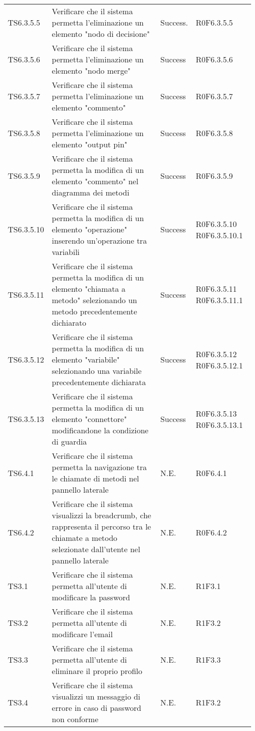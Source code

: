 \begin{longtable}{p{2.5cm}!{\VRule[1pt]}p{6cm}!{\VRule[1pt]}p{1.5cm}!{\VRule[1pt]}p{3cm}}
TS6.3.5.5 & Verificare che il sistema permetta l'eliminazione un elemento "nodo di decisione" & Success. & R0F6.3.5.5\\
TS6.3.5.6 & Verificare che il sistema permetta l'eliminazione un elemento "nodo merge" & Success & R0F6.3.5.6\\
TS6.3.5.7 & Verificare che il sistema permetta l'eliminazione un elemento "commento" & Success & R0F6.3.5.7\\
TS6.3.5.8 & Verificare che il sistema permetta l'eliminazione un elemento "output pin" & Success & R0F6.3.5.8\\
TS6.3.5.9 & Verificare che il sistema permetta la modifica di un elemento "commento" nel diagramma dei metodi & Success & R0F6.3.5.9\\
TS6.3.5.10 & Verificare che il sistema permetta la modifica di un elemento "operazione" inserendo un'operazione tra variabili & Success & R0F6.3.5.10 R0F6.3.5.10.1\\
TS6.3.5.11 & Verificare che il sistema permetta la modifica di un elemento "chiamata a metodo" selezionando un metodo precedentemente dichiarato & Success & R0F6.3.5.11 R0F6.3.5.11.1\\
TS6.3.5.12 & Verificare che il sistema permetta la modifica di un elemento "variabile" selezionando una variabile precedentemente dichiarata & Success & R0F6.3.5.12 R0F6.3.5.12.1\\
TS6.3.5.13 & Verificare che il sistema permetta la modifica di un elemento "connettore" modificandone la condizione di guardia & Success & R0F6.3.5.13 R0F6.3.5.13.1\\
TS6.4.1 & Verificare che il sistema permetta la navigazione tra le chiamate di metodi nel pannello laterale & N.E. & R0F6.4.1\\
TS6.4.2 & Verificare che il sistema visualizzi la breadcrumb, che rappresenta il percorso tra le chiamate a metodo selezionate dall'utente nel pannello laterale & N.E. & R0F6.4.2\\
TS3.1 & Verificare che il sistema permetta all'utente di modificare la password & N.E. & R1F3.1 \\
TS3.2 & Verificare che il sistema permetta all'utente di modificare l'email & N.E. & R1F3.2 \\
TS3.3 & Verificare che il sistema permetta all'utente di eliminare il proprio profilo & N.E. & R1F3.3 \\
TS3.4 & Verificare che il sistema visualizzi un messaggio di errore in caso di password non conforme & N.E. & R1F3.2 \\

\end{longtable}
